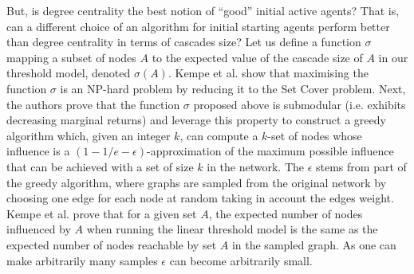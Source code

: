 \documentclass[10pt]{article}
\begin{document}
But, is degree centrality the best notion of ``good'' initial active agents? That is, can a different choice of an algorithm for initial starting agents perform better than degree centrality in terms of cascades size? Let us define a function $\sigma$ mapping a subset of nodes $A$ to the expected value of the cascade size of $A$ in our threshold model, denoted $\sigma(A)$.
Kempe et al. \cite{kempe2003maximizing} show that maximising the function $\sigma$ is an NP-hard problem by reducing it to the Set Cover problem. Next, the authors prove that the function $\sigma$ proposed above is submodular (i.e. exhibits decreasing marginal returns) and leverage this property to construct a greedy algorithm which, given an integer $k$, can compute a $k$-set of nodes whose influence is a $(1-1/e-\epsilon)$-approximation of the maximum possible influence that can be achieved with a set of size $k$ in the network. The $\epsilon$ stems from part of the greedy algorithm, where graphs are sampled from the original network by choosing one edge for each node at random taking in account the edges weight. Kempe et al. prove that for a given set $A$, the expected number of nodes influenced by $A$ when running the linear threshold model is the same as the expected number of nodes reachable by set $A$ in the sampled graph. As one can make arbitrarily many samples $\epsilon$ can become arbitrarily small.\\
\end{document}
